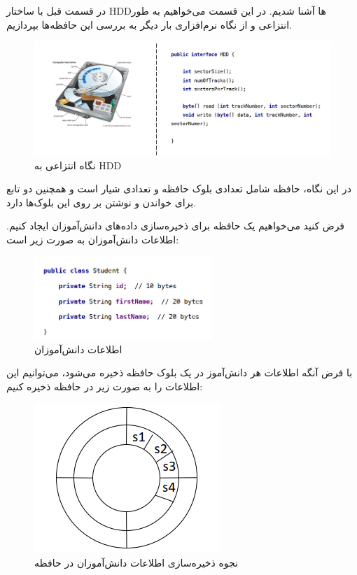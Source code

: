 \begin{flushright}
    در قسمت قبل با ساختار HDDها آشنا شدیم.
    در این قسمت می‌خواهیم به طور انتزاعی و از نگاه نرم‌افزاری بار دیگر به بررسی این حافظه‌ها بپردازیم.

    \begin{figure}[H]
        \centering
        \includegraphics[width=\textwidth]{source/hdd-abstract-view}
        \caption{نگاه انتزاعی به HDD}
        \label{fig:hdd-abstract-view}
    \end{figure}

    در این نگاه، حافظه شامل تعدادی بلوک حافظه و تعدادی شیار است و همچنین دو تابع برای خواندن و نوشتن بر روی این بلوک‌ها دارد.

    فرض کنید می‌خواهیم یک حافظه برای ذخیره‌سازی داده‌های دانش‌آموزان ایجاد کنیم.
    اطلاعات دانش‌آموزان به صورت زیر است:

    \begin{figure}[H]
        \centering
        \includegraphics[width=0.6\textwidth]{source/student-data-model-1}
        \caption{اطلاعات دانش‌آموزان}
        \label{fig:student-data-model-1}
    \end{figure}

    با فرض آنگه اطلاعات هر دانش‌آموز در یک بلوک حافظه ذخیره می‌شود، می‌توانیم این اطلاعات را به صورت زیر در حافظه ذخیره کنیم:

    \begin{figure}[H]
        \centering
        \includegraphics[scale=1]{source/student-on-HDD}
        \caption{نجوه ذخیره‌سازی اطلاعات دانش‌آموزان در حافظه}
        \label{fig:student-on-HDD}
    \end{figure}


\end{flushright}
